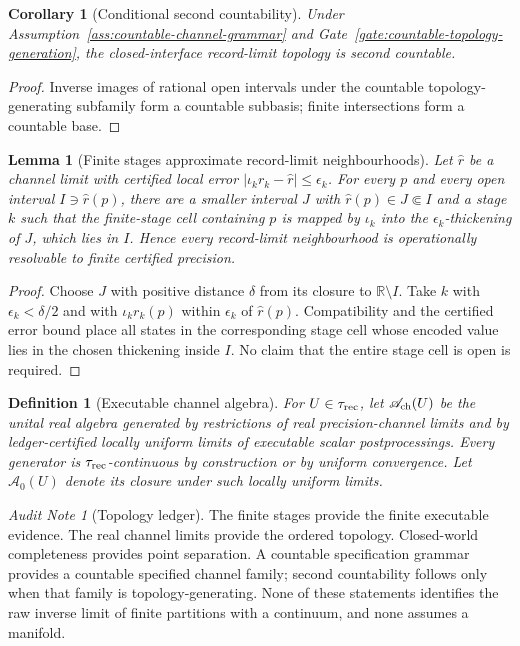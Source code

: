 \documentclass[11pt]{article}
\newtheorem{lemma}[theorem]{Lemma}
\newtheorem{corollary}[theorem]{Corollary}
\newtheorem{definition}[theorem]{Definition}
\theoremstyle{remark}
\newtheorem{audit}[theorem]{Audit Note}
\begin{document}
\begin{corollary}[Conditional second countability]
\label{prop:record-second-countable}
Under Assumption~\ref{ass:countable-channel-grammar} and
Gate~\ref{gate:countable-topology-generation}, the closed-interface
record-limit topology is second countable.
\end{corollary}

\begin{proof}
Inverse images of rational open intervals under the countable
topology-generating subfamily form a countable subbasis; finite intersections
form a countable base.
\end{proof}

\begin{lemma}[Finite stages approximate record-limit neighbourhoods]
\label{lem:uniform-limits-no-refinement}
Let $\widehat r$ be a channel limit with certified local error
$|\iota_k r_k-\widehat r|\le\epsilon_k$.  For every $p$ and every open interval
$I\ni\widehat r(p)$, there are a smaller interval $J$ with
$\widehat r(p)\in J\Subset I$ and a stage $k$ such that the finite-stage cell
containing $p$ is mapped by $\iota_k$ into the $\epsilon_k$-thickening of $J$,
which lies in $I$.  Hence every record-limit neighbourhood is operationally
resolvable to finite certified precision.
\end{lemma}

\begin{proof}
Choose $J$ with positive distance $\delta$ from its closure to
$\mathbb R\setminus I$.  Take $k$ with $\epsilon_k<\delta/2$ and with
$\iota_k r_k(p)$ within $\epsilon_k$ of $\widehat r(p)$.  Compatibility and
the certified error bound place all states in the corresponding stage cell
whose encoded value lies in the chosen thickening inside $I$.  No claim that
the entire stage cell is open is required.
\end{proof}

\begin{definition}[Executable channel algebra]
\label{def:finite-record-algebra-topology}
For $U\in\tau_{\rm rec}$, let $\mathscr A_{\rm ch}(U)$ be the unital real
algebra generated by restrictions of real precision-channel limits and by
ledger-certified locally uniform limits of executable scalar postprocessings.
Every generator is $\tau_{\rm rec}$-continuous by construction or by uniform
convergence.  Let $\mathscr A_0(U)$ denote its closure under such locally
uniform limits.
\end{definition}

\begin{audit}[Topology ledger]
The finite stages provide the finite executable evidence.  The real channel
limits provide the ordered topology.  Closed-world completeness provides point
separation.  A countable specification grammar provides a countable specified channel family; second
countability follows only when that family is topology-generating.  None of these statements identifies the raw inverse limit of
finite partitions with a continuum, and none assumes a manifold.
\end{audit}
\end{document}
